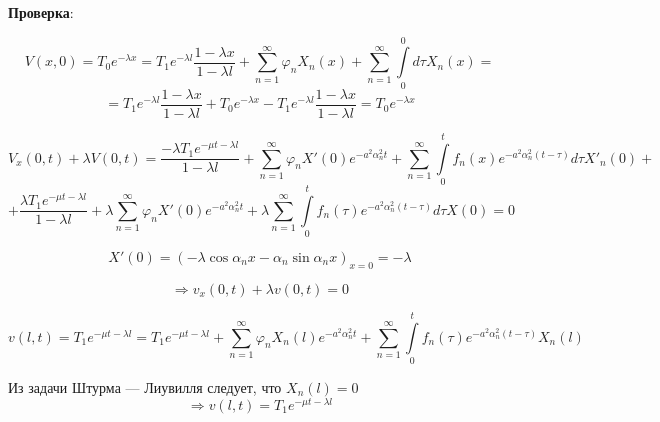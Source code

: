 \textbf{Проверка}:

$$ V(x, 0) = T_{0}e^{-\lambda x} = T_{1}e^{-\lambda l} \dfrac{1 - \lambda x}{1 - \lambda l} + \sum_{n=1}^{\infty} \varphi_{n} X_{n}(x) +  \sum_{n=1}^{\infty} \int\limits_0^0 d\tau X_{n}(x) = $$
$$ = T_{1}e^{-\lambda l} \dfrac{1 - \lambda x}{1 - \lambda l} + T_{0}e^{-\lambda x} - T_{1}e^{-\lambda l} \dfrac{1 - \lambda x}{1 - \lambda l} = T_{0}e^{-\lambda x}$$

$$ V_{x}(0, t) + \lambda V(0, t) = \dfrac{-\lambda T_{1} e^{-\mu t - \lambda l}}{1 - \lambda l} + \sum_{n=1}^{\infty} \varphi_{n} X'(0) e^{-a^{2}\alpha_{n}^{2}t} + \sum_{n=1}^{\infty} \int\limits_0^t f_{n}(x) e^{-a^{2}\alpha_{n}^{2}(t - \tau)} d\tau X'_{n}(0) + $$
$$ + \dfrac{\lambda T_{1} e^{-\mu t - \lambda l}}{1 - \lambda l} + \lambda \sum_{n=1}^{\infty} \varphi_{n} X'(0)e^{-a^{2}\alpha_{n}^{2}t} + \lambda \sum_{n=1}^{\infty} \int\limits_0^t f_{n}(\tau) e^{-a^{2}\alpha_{n}^{2}(t - \tau)} d\tau X(0) = 0 $$

$$ X'(0) = (-\lambda \cos{\alpha_{n}x} - \alpha_{n}\sin{\alpha_{n}x})_{x = 0} = -\lambda$$

$$ \Rightarrow v_{x}(0, t) + \lambda v(0, t) = 0$$

$$ v(l, t) = T_{1}e^{-\mu t - \lambda l} = T_{1} e^{-\mu t - \lambda l} + \sum_{n=1}^{\infty} \varphi_{n} X_{n}(l)e^{-a^{2}\alpha_{n}^{2}t} + \sum_{n=1}^{\infty} \int\limits_0^t f_{n}(\tau) e^{-a^{2}\alpha_{n}^{2}(t - \tau)} X_{n}(l) $$

Из задачи Штурма — Лиувилля следует, что $X_{n}(l) = 0$
$$ \Rightarrow v(l, t) = T_{1} e^{-\mu t - \lambda l}$$


\pagebreak